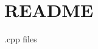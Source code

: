 \chapter{README}
\hypertarget{md_game_2src_2_r_e_a_d_m_e}{}\label{md_game_2src_2_r_e_a_d_m_e}
.cpp files 